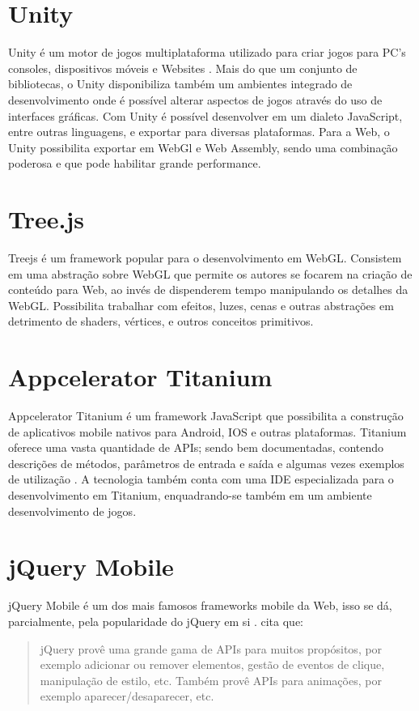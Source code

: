 \section{Unity}

Unity é um motor de jogos multiplataforma utilizado para criar jogos
para PC's consoles, dispositivos móveis e Websites \textsc{\autocite{unity}}.
Mais do que um conjunto de bibliotecas, o Unity disponibiliza também
um ambientes integrado de desenvolvimento onde é possível alterar
aspectos de jogos através do uso de interfaces gráficas. Com Unity é possível
desenvolver em um dialeto JavaScript, entre outras linguagens, e
exportar para diversas plataformas. Para a Web, o Unity possibilita
exportar em WebGl e Web Assembly, sendo uma combinação poderosa e que
pode habilitar grande performance.

\section{Tree.js}

Treejs é um framework popular para o desenvolvimento em WebGL.
Consistem em uma abstração sobre WebGL que permite os autores se
focarem na criação de conteúdo para Web, ao invés de dispenderem
tempo manipulando os detalhes da WebGL. Possibilita trabalhar com
efeitos, luzes, cenas e outras abstrações em detrimento de shaders,
vértices, e outros conceitos primitivos.

\section{Appcelerator Titanium}

Appcelerator Titanium é um framework JavaScript que possibilita a
construção de aplicativos mobile nativos para Android, IOS e outras
plataformas. Titanium oferece uma vasta quantidade de APIs; sendo
bem documentadas, contendo descrições de métodos, parâmetros de
entrada e saída e algumas vezes exemplos de utilização \autocite[p.
2]{crossPlatformAppsAnimations}. A tecnologia também conta com uma IDE
especializada para o desenvolvimento em Titanium, enquadrando-se também
em um ambiente desenvolvimento de jogos.

\section{jQuery Mobile}

jQuery Mobile é um dos mais famosos frameworks mobile da Web,
isso se dá, parcialmente, pela popularidade do jQuery em si
\textsc{\autocite[p. 14]{viabilityBusinessApplications}}. \citet[p.
2]{crossPlatformAppsAnimations} cita que:
\begin{quote}
jQuery provê uma grande gama de APIs para muitos propósitos, por
exemplo adicionar ou remover elementos, gestão de eventos de clique,
manipulação de estilo, etc. Também provê APIs para animações, por
exemplo aparecer/desaparecer, etc.
\end{quote}

